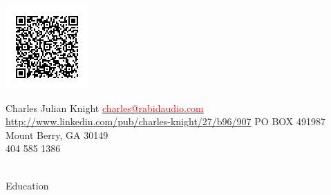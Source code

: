 \documentclass[a4paper,12pt]{article}
\begin{document}
\oddsidemargin=-1cm
\setmainfont

\begin{floatingfigure}[1]{4in}
\centering
\includegraphics{chart.png}
\end{floatingfigure}
\header
{\LARGE{Charles Julian Knight}}
{{\hspace{.08in}\small \href{mailto:charles@rabidaudio.com}{\textcolor{red}{charles@rabidaudio.com}}}\\
\hspace{0in} \scriptsize \url{http://www.linkedin.com/pub/charles-knight/27/b96/907}}
{PO BOX 491987\\Mount Berry, GA 30149\\
{404 585 1386}\\ %
}\\



\begin{resumeblock}{Education}
\largeskip

\end{resumeblock}

\end{document}
